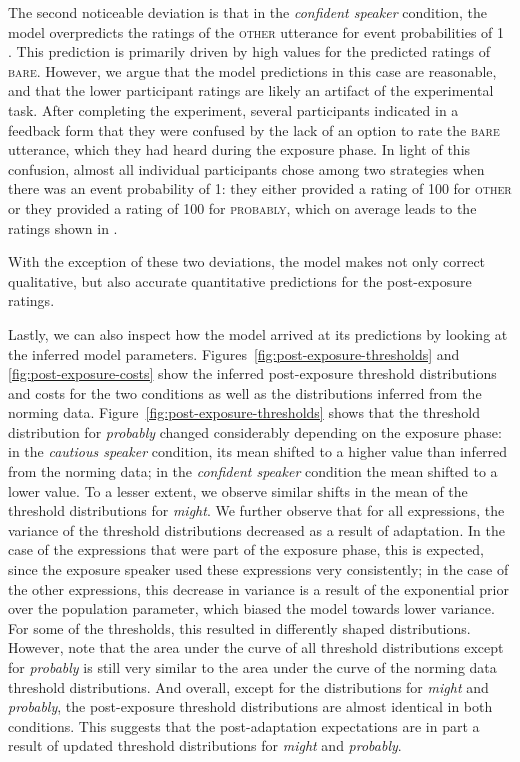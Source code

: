 The second noticeable deviation is that in the \textit{confident speaker} condition, the model overpredicts the ratings of the \textsc{other} utterance for event probabilities of 1 . This prediction is primarily driven by high values for the predicted ratings of \textsc{bare}. However, we argue that the model predictions in this case are reasonable, and that the lower participant ratings are likely an artifact of the experimental task. After completing the experiment, 
several participants indicated in a feedback form that they were confused by the lack of an option to rate the \textsc{bare} utterance, 
which they had heard during the exposure phase. In light of this confusion, almost all individual participants chose among two strategies when there was an event probability of 1: they either provided a rating of 100 for \textsc{other} 
or they provided a rating of 100 for \textsc{probably}, which on average leads to the ratings shown in .

With the exception of these two deviations, the model makes not only correct qualitative, but also accurate quantitative predictions for the post-exposure ratings.

Lastly, we can also inspect how the model arrived at its predictions by looking at the inferred model parameters.  
Figures~\ref{fig:post-exposure-thresholds} and \ref{fig:post-exposure-costs} show the inferred
post-exposure threshold distributions and costs for the two conditions as well as the distributions inferred from the norming data.
Figure~\ref{fig:post-exposure-thresholds} shows that the threshold distribution for \textit{probably}
changed considerably depending on the exposure phase: in the \textit{cautious speaker} condition,
its mean shifted to a higher value than  inferred from the norming data; in the \textit{confident speaker} condition the mean 
shifted to a lower value. To a lesser extent, we observe similar shifts in the mean of the threshold
distributions for \textit{might}. We further observe that for all expressions, the variance of the threshold
distributions decreased as a result of adaptation. In the case of the expressions that were part of the exposure
phase, this is expected, since the exposure speaker used these expressions very consistently; in the case of the
other expressions, this decrease in variance is a result of the exponential prior over the population parameter,
which biased the model towards lower variance. For some of the thresholds, this resulted in differently shaped distributions.
However, note that the area under the curve of all threshold distributions except for \textit{probably} is still very similar to the 
area under the curve of the norming data threshold distributions. And overall, except for the distributions
for \textit{might} and \textit{probably}, the post-exposure threshold distributions are almost identical in both conditions.
This suggests that the post-adaptation expectations 
are in part a result of updated threshold distributions for \textit{might} and \textit{probably}.

